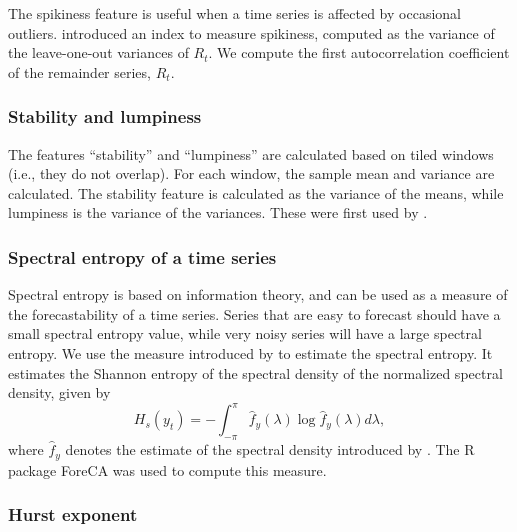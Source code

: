 \documentclass[11pt,a4paper,]{article}
\begin{document}
The spikiness feature is useful when a time series is affected by occasional outliers. \textcite{hyndman2015large} introduced an index to measure spikiness, computed as the variance of the leave-one-out variances of \(R_t\). We compute the first autocorrelation coefficient of the remainder series, \(R_t\).

\hypertarget{stability-and-lumpiness}{%
\subsubsection*{Stability and lumpiness}\label{stability-and-lumpiness}}

The features ``stability'' and ``lumpiness'' are calculated based on tiled windows (i.e., they do not overlap). For each window, the sample mean and variance are calculated. The stability feature is calculated as the variance of the means, while lumpiness is the variance of the variances. These were first used by \textcite{hyndman2015large}.

\hypertarget{spectral-entropy-of-a-time-series}{%
\subsubsection*{Spectral entropy of a time series}\label{spectral-entropy-of-a-time-series}}

Spectral entropy is based on information theory, and can be used as a measure of the forecastability of a time series. Series that are easy to forecast should have a small spectral entropy value, while very noisy series will have a large spectral entropy. We use the measure introduced by \textcite{goerg2013forecastable} to estimate the spectral entropy. It estimates the Shannon entropy of the spectral density of the normalized spectral density, given by
\[
    H_{s}(y_t) =-\int_{-\pi}^{\pi}\hat f_y(\lambda)\log \hat f_y({\lambda})d\lambda,
\]
where \(\hat{f}_y\) denotes the estimate of the spectral density introduced by \textcite{nuttall1982spectral}. The R package ForeCA \autocite{Foreca} was used to compute this measure.

\hypertarget{hurst-exponent}{%
\subsubsection*{Hurst exponent}\label{hurst-exponent}}
\end{document}

